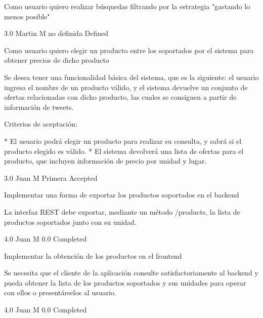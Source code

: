 \vspace{20pt}

	{Como usuario quiero realizar búsquedas filtrando por la estrategia "gastando lo menos posible"} %
	{

} %
	{} %
	{3.0} %
	{Martin M} %
	{no definida} %
	{Defined} %


\vspace{20pt}

	{Como usuario quiero elegir un producto entre los soportados por el sistema para obtener precios de dicho producto} %
	{Se desea tener una funcionalidad básica del sistema, que es la siguiente: el
usuario ingresa el nombre de un producto válido, y el sistema devuelve un
conjunto de ofertas relacionadas con dicho producto, las cuales se consiguen a
partir de información de tweets.

  
Criterios de aceptación:

* El usuario podrá elegir un producto para realizar su consulta, y sabrá si el producto elegido es válido.  
* El sistema devolverá una lista de ofertas para el producto, que incluyen información de precio por unidad y lugar.

} %
	{} %
	{3.0} %
	{Juan M} %
	{Primera} %
	{Accepted} %

		{Implementar una forma de exportar los productos soportados en el backend} %
		{La interfaz REST debe exportar, mediante un método /products, la lista de
productos soportados junto con su unidad.

} %
		{4.0} %
		{Juan M} %
		{0.0} %
		{Completed} %

		{Implementar la obtención de los productos en el frontend} %
		{Se necesita que el cliente de la aplicación consulte satisfactoriamente al
backend y pueda obtener la lista de los productos soportados y sus unidades
para operar con ellos o presentárselos al usuario.

} %
		{4.0} %
		{Juan M} %
		{0.0} %
		{Completed} %

